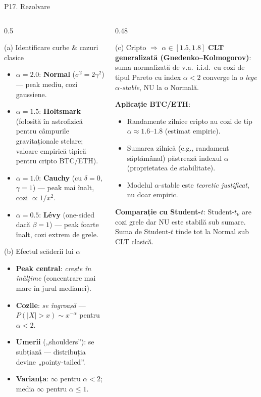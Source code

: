 \documentclass[9pt, aspectratio=169, t]{beamer}
\begin{document}
\begin{frame}[shrink=22]{P17. Rezolvare}
\begin{columns}[T]
\begin{column}{0.5\textwidth}
\begin{block}{(a) Identificare curbe \& cazuri clasice}
\begin{itemize}\setlength{\itemsep}{1pt}
\item $\alpha=2.0$: \textbf{Normal} ($\sigma^2=2\gamma^2$) --- peak mediu, cozi gaussiene.
\item $\alpha=1.5$: \textbf{Holtsmark} (folosită în astrofizică pentru câmpurile gravitaționale stelare; valoare empirică tipică pentru cripto BTC/ETH).
\item $\alpha=1.0$: \textbf{Cauchy} (cu $\delta=0$, $\gamma=1$) --- peak mai înalt, cozi $\propto 1/x^2$.
\item $\alpha=0.5$: \textbf{Lévy} (one-sided dacă $\beta=1$) --- peak foarte înalt, cozi extrem de grele.
\end{itemize}
\end{block}
\begin{block}{(b) Efectul scăderii lui $\alpha$}
\begin{itemize}\setlength{\itemsep}{0pt}
\item \textbf{Peak central}: \emph{crește în înălțime} (concentrare mai mare în jurul medianei).
\item \textbf{Cozile}: \emph{se îngroașă} --- $P(|X|>x)\sim x^{-\alpha}$ pentru $\alpha<2$.
\item \textbf{Umerii} („shoulders''): se subțiază --- distribuția devine „pointy-tailed''.
\item \textbf{Varianța}: $\infty$ pentru $\alpha<2$; media $\infty$ pentru $\alpha\leq 1$.
\end{itemize}
\end{block}
\end{column}
\begin{column}{0.48\textwidth}
\begin{block}{(c) Cripto $\Rightarrow$ $\alpha\in[1.5,1.8]$}
\textbf{CLT generalizată (Gnedenko--Kolmogorov)}: suma normalizată de v.a.\ i.i.d.\ cu cozi de tipul Pareto cu index $\alpha<2$ converge la o \emph{lege $\alpha$-stable}, NU la o Normală.

\textbf{Aplicație BTC/ETH}:
\begin{itemize}\setlength{\itemsep}{0pt}
\item Randamente zilnice cripto au cozi de tip $\alpha\approx 1.6$--$1.8$ (estimat empiric).
\item Sumarea zilnică (e.g., randament săptămânal) păstrează indexul $\alpha$ (proprietatea de stabilitate).
\item Modelul $\alpha$-stable este \emph{teoretic justificat}, nu doar empiric.
\end{itemize}
\textbf{Comparație cu Student-$t$}: Student-$t_\nu$ are cozi grele dar NU este stabilă sub sumare. Suma de Student-$t$ tinde tot la Normal sub CLT clasică.
\end{block}
\end{column}
\end{columns}
\end{frame}
\end{document}
